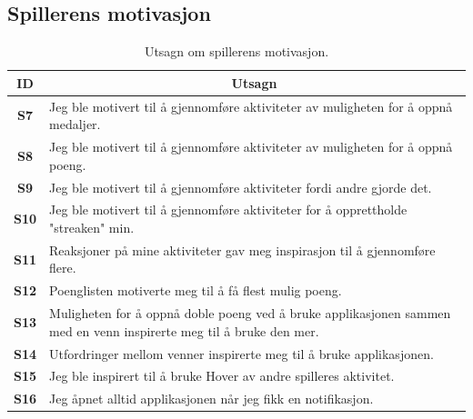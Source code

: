 \subsection*{Spillerens motivasjon}
\begin{table}[H]
    \centering
    \begin{tabularx}{\textwidth}{|c|X|}
        \hline
        \textbf{ID} & \multicolumn{1}{c|}{\textbf{Utsagn}} \\ \hline
        \textbf{S7} & Jeg ble motivert til å gjennomføre aktiviteter av muligheten for å oppnå medaljer.  \\ 
        \textbf{S8} & Jeg ble motivert til å gjennomføre aktiviteter av muligheten for å oppnå poeng. \\ 
        \textbf{S9} & Jeg ble motivert til å gjennomføre aktiviteter fordi andre gjorde det. \\ 
        \textbf{S10} & Jeg ble motivert til å gjennomføre aktiviteter for å opprettholde "streaken" min. \\ 
        \textbf{S11} & Reaksjoner på mine aktiviteter gav meg inspirasjon til å gjennomføre flere.  \\ 
        \textbf{S12} & Poenglisten motiverte meg til å få flest mulig poeng. \\ 
        \textbf{S13} & Muligheten for å oppnå doble poeng ved å bruke applikasjonen sammen med en venn inspirerte meg til å bruke den mer. \\ 
        \textbf{S14} & Utfordringer mellom venner inspirerte meg til å bruke applikasjonen.   \\ 
        \textbf{S15} & Jeg ble inspirert til å bruke Hover av andre spilleres aktivitet.  \\ 
        \textbf{S16} & Jeg åpnet alltid applikasjonen når jeg fikk en notifikasjon.  \\ \hline
    \end{tabularx}
    \caption{Utsagn om spillerens motivasjon.}
    \label{tab:appendix_no_player_motivation_statements}
\end{table}

